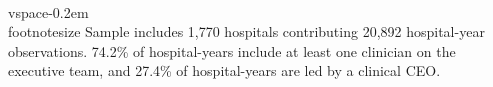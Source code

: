 

\\vspace{-0.2em}
{\\footnotesize Sample includes 1,770 hospitals contributing 20,892 hospital-year observations. 74.2\% of hospital-years include at least one clinician on the executive team, and 27.4\% of hospital-years are led by a clinical CEO.}
